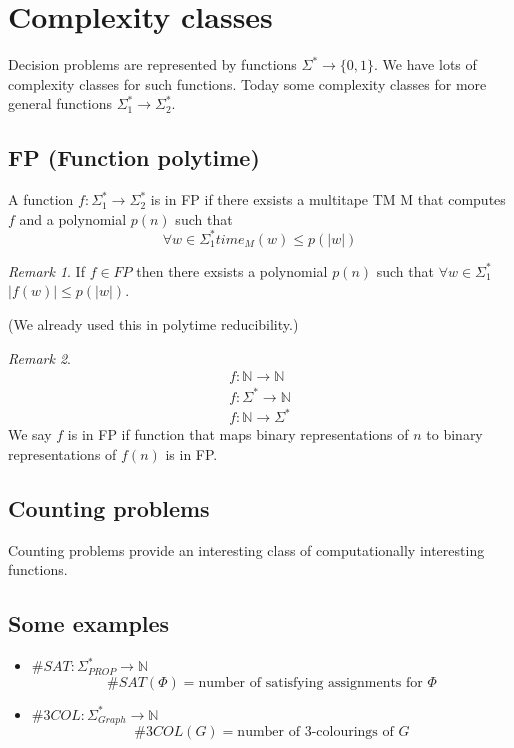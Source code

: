 \documentclass[a4paper,12pt]{article}
\theoremstyle{definition}
\theoremstyle{remark}
\newtheorem*{remark}{Remark}
\newcommand{\N}{\mathbb{N}}
\begin{document}
\newpage
\section{Complexity classes}
Decision problems are represented by functions $\Sigma^* \to \{0, 1\}$. We have lots of complexity classes for such functions.
Today some complexity classes for more general functions $\Sigma_1^* \to \Sigma_2^*$.

\subsection{FP (Function polytime)}
A function $f: \Sigma_1^* \to \Sigma_2^*$ is in FP if there exsists a multitape TM M that 
computes $f$ and a polynomial $p(n)$ such that
\begin{equation*}
    \forall w \in \Sigma_1^* time_M(w) \leq p(|w|)
\end{equation*}

\begin{remark}
    If $f \in FP$ then there exsists a polynomial $p(n)$ such that $\forall w \in \Sigma_1^*$ $|f(w)| \leq p(|w|)$.
\end{remark}

(We already used this in polytime reducibility.)

\begin{remark}
    \begin{gather*}
        f: \N \to \N \\
        f: \Sigma^* \to \N \\
        f: \N \to \Sigma^*
    \end{gather*}
    We say $f$ is in FP if function that maps binary representations of $n$ to binary representations of $f(n)$ is in FP.%
\end{remark}

\subsection{Counting problems}
Counting problems provide an interesting class of computationally interesting functions.

\subsection{Some examples}

\begin{itemize}
    \item $\#SAT: \Sigma_{PROP}^* \to \N$
    \begin{equation*}
        \#SAT(\Phi) = \text{number of satisfying assignments for } \Phi
    \end{equation*}
    \item $\#3COL: \Sigma_{Graph}^* \to \N$
    \begin{equation*}
        \#3COL(G) = \text{number of 3-colourings of } G
    \end{equation*}
\end{itemize}
\end{document}
